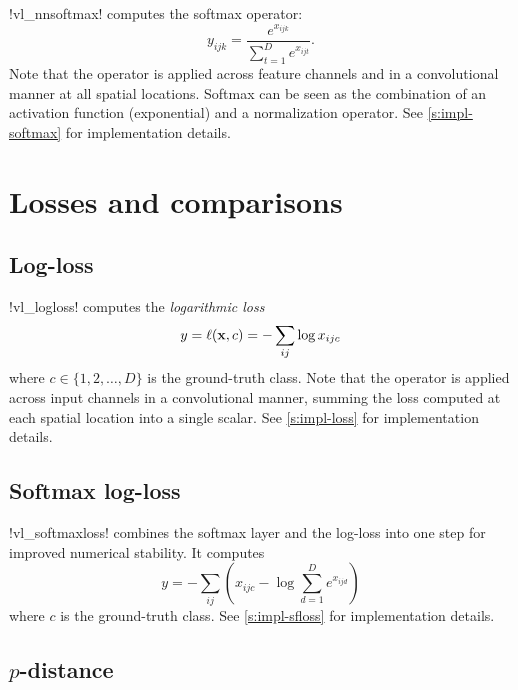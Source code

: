 !vl_nnsoftmax! computes the softmax operator:
\[
 y_{ijk} = \frac{e^{x_{ijk}}}{\sum_{t=1}^D e^{x_{ijt}}}.
\]
Note that the operator is applied across feature channels and in a convolutional manner at all spatial locations. Softmax can be seen as the combination of an activation function (exponential) and a normalization operator. See \autoref{s:impl-softmax} for implementation details.

\section{Losses and comparisons}\label{s:losses}

\subsection{Log-loss}\label{s:loss}

!vl_logloss! computes the \emph{logarithmic loss}
\[
 y = \ell(\mathbf{x},c) = - \sum_{ij} \log x_{ijc}
\]
where $c \in \{1,2,\dots,D\}$ is the ground-truth class. Note that the operator is applied across input channels in a convolutional manner, summing the loss computed at each spatial location into a single scalar.  See \autoref{s:impl-loss} for implementation details.

\subsection{Softmax log-loss}\label{s:sfloss}

!vl_softmaxloss! combines the softmax layer and the log-loss into one step for improved numerical stability. It computes
\[
y = - \sum_{ij} \left(
x_{ijc} - \log \sum_{d=1}^D e^{x_{ijd}}
\right)
\]
where $c$ is the ground-truth class. See \autoref{s:impl-sfloss} for implementation details.

\subsection{$p$-distance}\label{s:pdistance}

